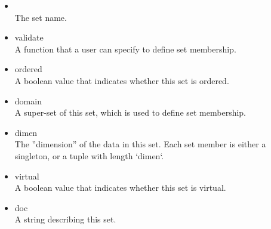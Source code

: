 \begin{itemize}

\item {}\\
    The set name.

\item validate\\
    A function that a user can specify to define set membership.

\item ordered\\
    A boolean value that indicates whether this set is ordered.

\item domain\\
    A super-set of this set, which is used to define set membership.

\item dimen\\
    The ''dimension'' of the data in this set.  Each set member is either a singleton, or a tuple with length `dimen`.

\item virtual\\
    A boolean value that indicates whether this set is virtual.

\item doc\\
    A string describing this set.
\end{itemize}
\fi


